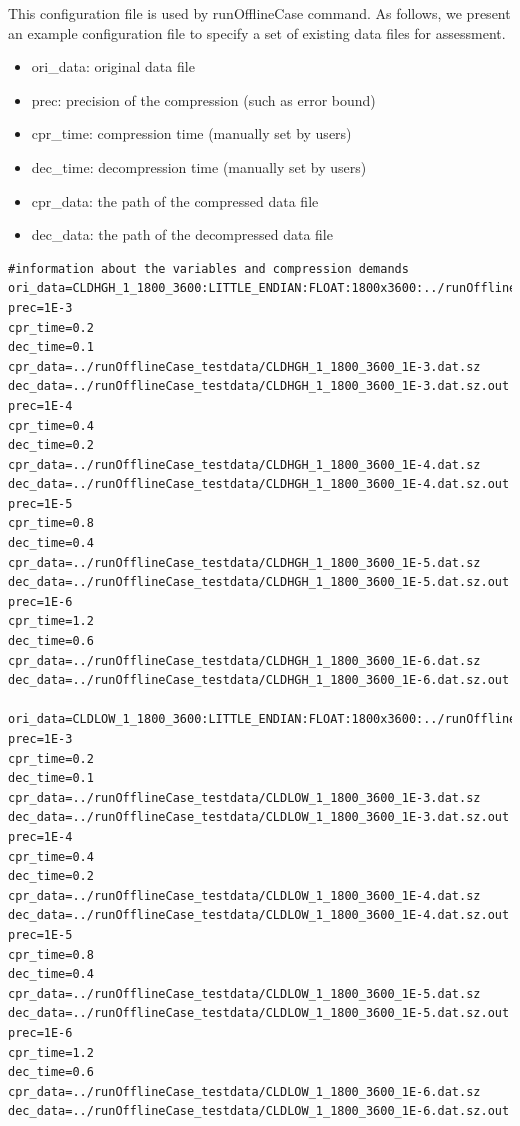 This configuration file is used by runOfflineCase command. 
As follows, we present an example configuration file to specify a set of existing data files for assessment.
\begin{itemize}
  \item ori\_data: original data file
  \item prec: precision of the compression (such as error bound)
  \item cpr\_time: compression time (manually set by users)
  \item dec\_time: decompression time (manually set by users)
  \item cpr\_data: the path of the compressed data file
  \item dec\_data: the path of the decompressed data file
\end{itemize}
\begin{lstlisting}[style=ShellStyleInline, basicstyle =\footnotesize\ttfamily]
#information about the variables and compression demands
ori_data=CLDHGH_1_1800_3600:LITTLE_ENDIAN:FLOAT:1800x3600:../runOfflineCase_testdata/CLDHGH_1_1800_3600.dat
prec=1E-3
cpr_time=0.2
dec_time=0.1
cpr_data=../runOfflineCase_testdata/CLDHGH_1_1800_3600_1E-3.dat.sz
dec_data=../runOfflineCase_testdata/CLDHGH_1_1800_3600_1E-3.dat.sz.out
prec=1E-4
cpr_time=0.4
dec_time=0.2
cpr_data=../runOfflineCase_testdata/CLDHGH_1_1800_3600_1E-4.dat.sz
dec_data=../runOfflineCase_testdata/CLDHGH_1_1800_3600_1E-4.dat.sz.out
prec=1E-5
cpr_time=0.8
dec_time=0.4
cpr_data=../runOfflineCase_testdata/CLDHGH_1_1800_3600_1E-5.dat.sz
dec_data=../runOfflineCase_testdata/CLDHGH_1_1800_3600_1E-5.dat.sz.out
prec=1E-6
cpr_time=1.2
dec_time=0.6
cpr_data=../runOfflineCase_testdata/CLDHGH_1_1800_3600_1E-6.dat.sz
dec_data=../runOfflineCase_testdata/CLDHGH_1_1800_3600_1E-6.dat.sz.out

ori_data=CLDLOW_1_1800_3600:LITTLE_ENDIAN:FLOAT:1800x3600:../runOfflineCase_testdata/CLDLOW_1_1800_3600.dat
prec=1E-3
cpr_time=0.2
dec_time=0.1
cpr_data=../runOfflineCase_testdata/CLDLOW_1_1800_3600_1E-3.dat.sz
dec_data=../runOfflineCase_testdata/CLDLOW_1_1800_3600_1E-3.dat.sz.out
prec=1E-4
cpr_time=0.4
dec_time=0.2
cpr_data=../runOfflineCase_testdata/CLDLOW_1_1800_3600_1E-4.dat.sz
dec_data=../runOfflineCase_testdata/CLDLOW_1_1800_3600_1E-4.dat.sz.out
prec=1E-5
cpr_time=0.8
dec_time=0.4
cpr_data=../runOfflineCase_testdata/CLDLOW_1_1800_3600_1E-5.dat.sz
dec_data=../runOfflineCase_testdata/CLDLOW_1_1800_3600_1E-5.dat.sz.out
prec=1E-6
cpr_time=1.2
dec_time=0.6
cpr_data=../runOfflineCase_testdata/CLDLOW_1_1800_3600_1E-6.dat.sz
dec_data=../runOfflineCase_testdata/CLDLOW_1_1800_3600_1E-6.dat.sz.out
\end{lstlisting}

